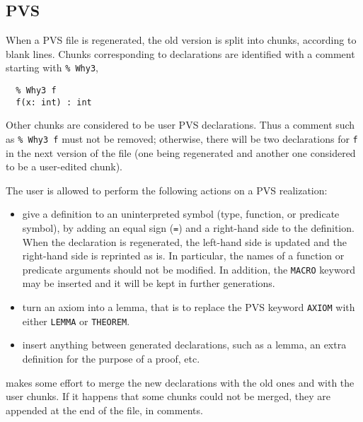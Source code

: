 \subsection{PVS}

When a PVS file is regenerated, the old version is split into chunks,
according to blank lines. Chunks corresponding to \why declarations
are identified with a comment starting with \verb+% Why3+, \eg
\begin{verbatim}
  % Why3 f
  f(x: int) : int
\end{verbatim}
Other chunks are considered to be user PVS declarations.
Thus a comment such as \verb+% Why3 f+ must not be removed;
otherwise, there will be two
declarations for \texttt{f} in the next version of the file (one being
regenerated and another one considered to be a user-edited chunk).

The user is allowed to perform the following actions on a PVS
realization:
\begin{itemize}
\item give a definition to an uninterpreted symbol (type, function, or
  predicate symbol), by adding an equal sign (\texttt{=}) and a
  right-hand side to the definition. When the declaration is
  regenerated, the left-hand side is updated and the right-hand side
  is reprinted as is. In particular, the names of a function or
  predicate arguments should not be modified. In addition, the
  \texttt{MACRO} keyword may be inserted and it will be kept in
  further generations.

\item turn an axiom into a lemma, that is to replace the PVS keyword
  \texttt{AXIOM} with either \texttt{LEMMA} or \texttt{THEOREM}.

\item insert anything between generated declarations, such as a lemma,
  an extra definition for the purpose of a proof, etc.
\end{itemize}
\why makes some effort to merge the new declarations with the old ones
and with the user chunks. If it happens that some chunks could not be
merged, they are appended at the end of the file, in comments.
